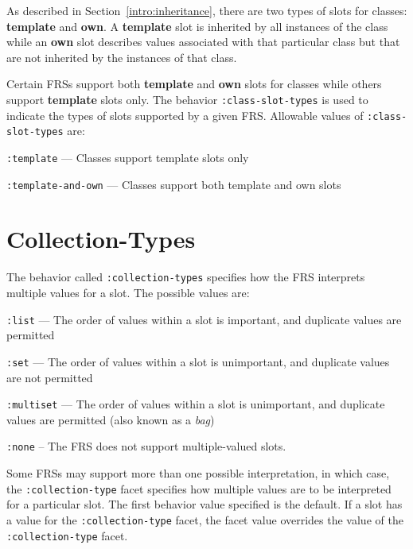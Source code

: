 As described in Section~\ref{intro:inheritance}, there are two types
of slots for classes: {\bf template} and {\bf own}.  A {\bf template}
slot is inherited by all instances of the class while an {\bf own}
slot describes values associated with that particular class but that
are not inherited by the instances of that class.  

Certain FRSs support both {\bf template} and {\bf own} slots for
classes while others support {\bf template} slots only.  The behavior
{\tt :class-slot-types} is used to indicate the types of slots
supported by a given FRS.  Allowable values of {\tt :class-slot-types}
are:

\bitem

\item {\tt :template} --- Classes support template slots only

\item {\tt :template-and-own} --- Classes support both template and own
slots 

\eitem

\section{Collection-Types}

The behavior called {\tt :collection-types} specifies how the FRS
interprets multiple values for a slot.  The possible values are:

\bitem
\item {\tt :list} --- The order of values within a slot is important,
and duplicate values are permitted

\item {\tt :set} --- The order of values within a slot is unimportant,
and duplicate values are not permitted

\item {\tt :multiset} --- The order of values within a slot is
unimportant, and duplicate values are permitted (also known as a {\em
bag})

\item {\tt :none} -- The FRS does not support multiple-valued slots.
\eitem

Some FRSs may support more than one possible interpretation, in which
case, the {\tt :collection-type} facet specifies how multiple values are
to be interpreted for a particular slot.  The first behavior value
specified is the default.  If a slot has a value for the {\tt :collection-type}
facet, the facet value overrides the value of the {\tt :collection-type} facet.



